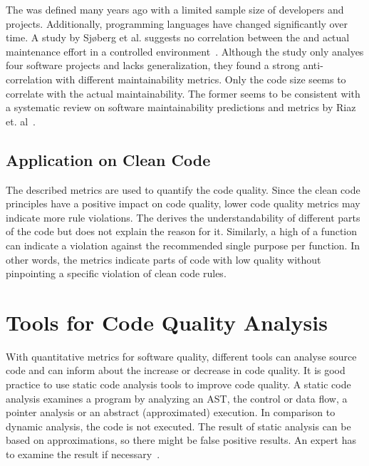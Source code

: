 The  was defined many years ago with a limited sample size of developers and projects. Additionally, programming languages have changed significantly over time. A study by Sjøberg et al. suggests no correlation between the  and actual maintenance effort in a controlled environment~\cite{sjoberg_questioning_nodate}. Although the study only analyes four software projects and lacks generalization, they found a strong anti-correlation with different maintainability metrics. Only the code size seems to correlate with the actual maintainability. The former seems to be consistent with a systematic review on software maintainability predictions and metrics by Riaz et. al~\cite{riaz_systematic_2009}.

\subsection{Application on Clean Code}
The described metrics are used to quantify the code quality. Since the clean code principles have a positive impact on code quality, lower code quality metrics may indicate more rule violations. The  derives the understandability of different parts of the code but does not explain the reason for it. Similarly, a high  of a function can indicate a violation against the recommended single purpose per function. In other words, the metrics indicate parts of code with low quality without pinpointing a specific violation of clean code rules. 


\section{Tools for Code Quality Analysis}\label{sec:tool_comparison}
With quantitative metrics for software quality, different tools can analyse source code and can inform about the increase or decrease in code quality. It is good practice to use static code analysis tools to improve code quality. A static code analysis examines a program by analyzing an AST, the control or data flow, a pointer analysis or an abstract (approximated) execution. In comparison to dynamic analysis, the code is not executed. The result of static analysis can be based on approximations, so there might be false positive results. An expert has to examine the result if necessary~\cite{prahofer_static_2017}.

